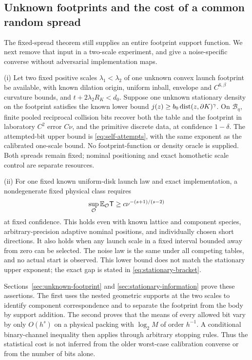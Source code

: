 \subsection{Unknown footprints and the cost of a common random spread}
The fixed-spread theorem still supplies an entire footprint support
function. We next remove that input in a two-scale experiment, and give
a noise-specific converse without adversarial implementation maps.

\begin{theorem}
\label{thm:self-main}
\textup{(i)} Let two fixed positive scales $\lambda_1<\lambda_2$ of one
unknown convex launch footprint be available, with known dilation origin,
uniform inball, envelope and $C^{6,\beta}$ curvature bounds, and
$t+2\lambda_2R_K<d_0$. Suppose one unknown stationary density on the
footprint satisfies the known lower bound
$j(z)\ge b_0\operatorname{dist}(z,\partial K)^\gamma$. On $\mathcal B_\eta$,
finite pooled reciprocal collision bits recover both the table and the
footprint in laboratory $C^2$ error $C\nu$, and the primitive discrete
data, at confidence $1-\delta$. The attempted-bit upper bound is
\eqref{eq:self-attempts}, with the same exponent as the calibrated
one-scale bound. No footprint-function or density oracle is supplied.
Both spreads remain fixed; nominal positioning and exact homothetic
scale control are separate resources.

\textup{(ii)} For one fixed known uniform-disk launch law and exact
implementation, a nondegenerate fixed physical class requires
\[
                  \sup_{\mathcal O}\mathbb E_{\mathcal O}\mathsf T
                         \ge c\nu^{-(s+1)/(s-2)}
\]
at fixed confidence. This holds even with known lattice and component
species, arbitrary-precision adaptive nominal positions, and
individually chosen short directions. It also holds when any launch
scale in a fixed interval bounded away from zero can be selected.
The noise law is the same under all competing tables, and no actual
start is observed. This lower bound does not match the stationary
upper exponent; the exact gap is stated in \eqref{eq:stationary-bracket}.
\end{theorem}

Sections~\ref{sec:unknown-footprint} and
\ref{sec:stationary-information} prove these assertions. The first
uses the nested geometric supports at the two scales to identify
component correspondence and to separate the footprint from the body
by support addition. The second proves that the means of every allowed
bit vary by only $O(h^s)$ on a physical packing with $\log_2M$ of
order $h^{-1}$. A conditional binary-channel inequality then applies
through arbitrary stopping rules. Thus the statistical cost is not
inferred from the older worst-case calibration converse or from the
number of bits alone.
